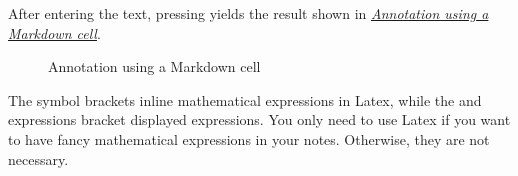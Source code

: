 \documentclass[letterpaper,10pt,english]{sphinxmanual}
\begin{document}
After entering the text, pressing  yields the result shown in {\hyperref[apdx2/apdx2_ipynb:fig-markdown]{\emph{Annotation using a Markdown cell}}}.
\begin{figure}[htbp]
\centering
\capstart

\caption{Annotation using a Markdown cell}\label{apdx2/apdx2_ipynb:fig-markdown}\end{figure}

The \code{\$} symbol brackets inline mathematical expressions in Latex, while the  and  expressions bracket displayed expressions.  You only need to use Latex if you want to have fancy mathematical expressions in your notes.  Otherwise, they are not necessary.
\end{document}
